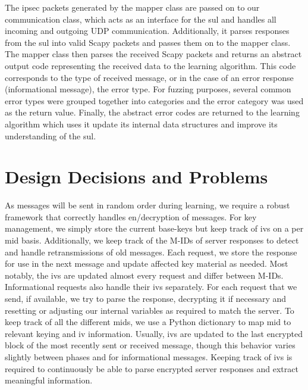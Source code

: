 The \ac{ipsec} packets generated by the mapper class are passed on to our communication class, which acts as an interface for the \ac{sul} and handles all incoming and outgoing UDP communication. Additionally, it parses responses from the \ac{sul} into valid Scapy packets and passes them on to the mapper class. The mapper class then parses the received Scapy packets and returns an abstract output code representing the received data to the learning algorithm. This code corresponds to the type of received message, or in the case of an error response (informational message), the error type. For fuzzing purposes, several common error types were grouped together into categories and the error category was used as the return value. Finally, the abstract error codes are returned to the learning algorithm which uses it update its internal data structures and improve its understanding of the \ac{sul}. \\


\section{Design Decisions and Problems} \label{subsec:design}

As messages will be sent in random order during learning, we require a robust framework that correctly handles en/decryption of messages. For key management, we simply store the current base-keys but keep track of \ac{iv}s on a per \ac{mid} basis. Additionally, we keep track of the M-IDs of server responses to detect and handle retransmissions of old messages. Each request, we store the response for use in the next message and update affected key material as needed. Most notably, the \ac{iv}s are updated almost every request and differ between M-IDs. Informational requests also handle their \ac{iv}s separately. For each request that we send, if available, we try to parse the response, decrypting it if necessary and resetting or adjusting our internal variables as required to match the server. To keep track of all the different \ac{mid}s, we use a Python dictionary to map \ac{mid} to relevant keying and \ac{iv} information. Usually, \ac{iv}s are updated to the last encrypted block of the most recently sent or received message, though this behavior varies slightly between phases and for informational messages. Keeping track of \ac{iv}s is required to continuously be able to parse encrypted server responses and extract meaningful information. 

